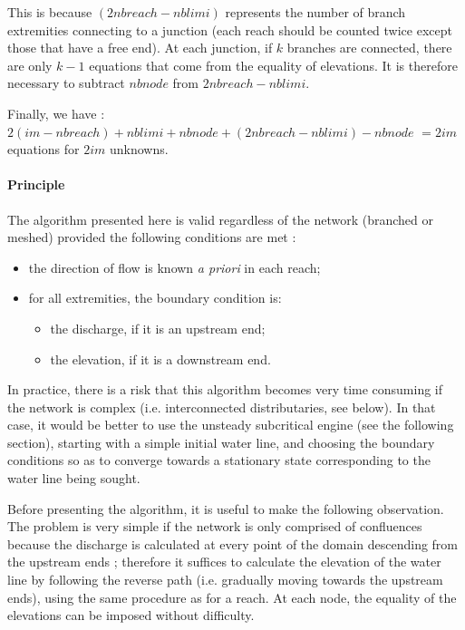 This is because $(2nbreach - nblimi)$ represents the number of branch extremities connecting to a junction (each reach should be counted twice except those that have a free end). At each junction, if $k$ branches are connected, there are only $k-1$ equations that come from the equality of elevations. It is therefore necessary to subtract $nbnode$ from $2nbreach - nblimi$.

\vspace{0.5cm}

Finally, we have : \\
$2 (im - nbreach) + nblimi + nbnode + (2 nbreach - nblimi) - nbnode$
$= 2 im$ equations for $2 im$ unknowns.

\paragraph{Principle\\}

\hspace*{1cm}

The algorithm presented here is valid regardless of the network (branched or meshed) provided the following conditions are met :
\begin{itemize}
 \item the direction of flow is known \textit{a priori} in each reach;
 \item for all extremities, the boundary condition is: 
   \begin{itemize}
     \item the discharge, if it is an upstream end;
     \item the elevation, if it is a downstream end.
    \end{itemize}
\end{itemize}

\vspace{0.5cm}

In practice, there is a risk that this algorithm becomes very time consuming if the network is complex (i.e. interconnected distributaries, see below). In that case, it would be better to use the unsteady subcritical engine (see the following section), starting with a simple initial water line, and choosing the boundary conditions so as to converge towards a stationary state corresponding to the water line being sought.

\vspace{0.5cm}

Before presenting the algorithm, it is useful to make the following observation. The problem is very simple if the network is only comprised of confluences because the discharge is calculated at every point of the domain descending from the upstream ends ; therefore it suffices to calculate the elevation of the water line by following the reverse path (i.e. gradually moving towards the upstream ends), using the same procedure as for a reach. At each node, the equality of the elevations can be imposed without difficulty.

